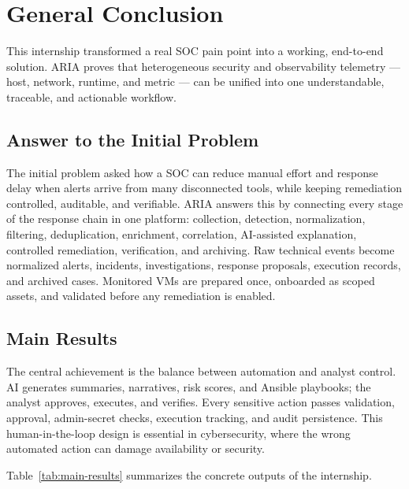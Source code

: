 \chapter*{General Conclusion}

This internship transformed a real SOC pain point into a working, end-to-end solution. ARIA proves that heterogeneous security and observability telemetry --- host, network, runtime, and metric --- can be unified into one understandable, traceable, and actionable workflow.

\section*{Answer to the Initial Problem}

The initial problem asked how a SOC can reduce manual effort and response delay when alerts arrive from many disconnected tools, while keeping remediation controlled, auditable, and verifiable. ARIA answers this by connecting every stage of the response chain in one platform: collection, detection, normalization, filtering, deduplication, enrichment, correlation, AI-assisted explanation, controlled remediation, verification, and archiving. Raw technical events become normalized alerts, incidents, investigations, response proposals, execution records, and archived cases. Monitored VMs are prepared once, onboarded as scoped assets, and validated before any remediation is enabled.

\section*{Main Results}

The central achievement is the balance between automation and analyst control. AI generates summaries, narratives, risk scores, and Ansible playbooks; the analyst approves, executes, and verifies. Every sensitive action passes validation, approval, admin-secret checks, execution tracking, and audit persistence. This human-in-the-loop design is essential in cybersecurity, where the wrong automated action can damage availability or security.

Table~\ref{tab:main-results} summarizes the concrete outputs of the internship.


